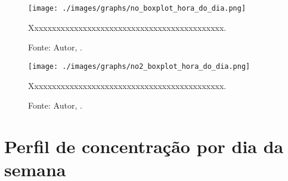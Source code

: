 


\lipsum[100]




\begin{figure}[H]
    \centering
    \texttt{[image: ./images/graphs/no\_boxplot\_hora\_do\_dia.png]}
    \caption{Xxxxxxxxxxxxxxxxxxxxxxxxxxxxxxxxxxxxxxxxxxxx.}
    \label{fig:no_boxplot_hora_do_dia.png}
    \caption*{Fonte: Autor, \imprimirdata.}
\end{figure}




\lipsum[100]




\begin{figure}[H]
    \centering
    \texttt{[image: ./images/graphs/no2\_boxplot\_hora\_do\_dia.png]}
    \caption{Xxxxxxxxxxxxxxxxxxxxxxxxxxxxxxxxxxxxxxxxxxxx.}
    \label{fig:no2_boxplot_hora_do_dia.png}
    \caption*{Fonte: Autor, \imprimirdata.}
\end{figure}




\lipsum[100]



\section{Perfil de concentração por dia da semana}


